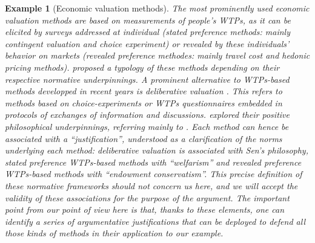 \documentclass[preprint, french, english, 11pt, authoryear]{elsarticle}%
\newtheorem{example}{Example}
\begin{document}
\begin{example}[Economic valuation methods]
The most prominently used economic valuation methods are based on measurements of people's \acp{WTP}, as it can be elicited by surveys addressed at individual (stated preference methods: mainly contingent valuation and choice experiment) or revealed by these individuals' behavior on markets (revealed preference methodes: mainly travel cost and hedonic pricing methods). \citet{meinard_ethical_2016} proposed a typology of these methods depending on their respective normative underpinnings. A prominent alternative to \acp{WTP}-based methods developped in recent years is deliberative valuation \citep{bartkowski_economic_2017}. This refers to methods based on choice-experiments or \acp{WTP} questionnaires embedded in protocols of exchanges of information and discussions. \citet{bartkowski_beyond_2018} explored their positive philosophical underpinnings, referring mainly to \citet{sen_idea_2009}. Each method can hence be associated with a ``justification'', understood as a clarification of the norms underlying each method: deliberative valuation is associated with Sen's philosophy, stated preference  \acp{WTP}-based methods with ``welfarism'' and revealed preference  \acp{WTP}-based methods with ``endowment conservatism''. This precise definition of these normative frameworks should not concern us here, and we will accept the validity of these associations for the purpose of the argument. The important point from our point of view here is that, thanks to these elements, one can identify a series of argumentative justifications that can be deployed to defend all those kinds of methods in their application to our example.
\end{example}
\end{document}
